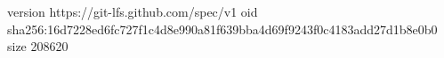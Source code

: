 version https://git-lfs.github.com/spec/v1
oid sha256:16d7228ed6fc727f1c4d8e990a81f639bba4d69f9243f0c4183add27d1b8e0b0
size 208620
